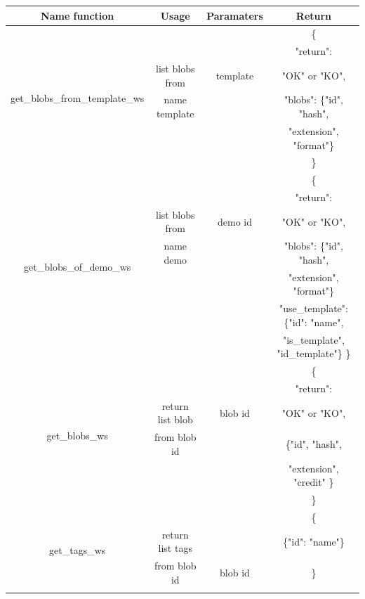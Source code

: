 \newpage
\begin{tabular}{|c||c|c|c|}
  \hline
  Name function & Usage & Paramaters & Return \tabularnewline
  \hline
  \multirow{6}{*}{get\_blobs\_from\_template\_ws}
  &                      &      & \{ \\
  &                      &      & "return": \\
  & list blobs from      & template  & "OK" or "KO", \\
  & name template        &      & "blobs": \{"id", "hash", \\
  &                      &      & "extension", "format"\} \\
  &                      &      & \} \\
  \hline
  \multirow{7}{*}{get\_blobs\_of\_demo\_ws}
  &                      &      & \{ \\
  &                      &      & "return": \\
  & list blobs from      & demo id & "OK" or "KO", \\
  & name demo            &      & "blobs": \{"id", "hash", \\
  &                      &      & "extension", "format"\} \\
  &                      &      & "use\_template": \{"id": "name", \\
  &                      &      & "is\_template", "id\_template"\} \} \\
  \hline
  \multirow{6}{*}{get\_blobs\_ws}
  &                      &      & \{ \\
  &                      &      & "return": \\
  & return list blob     & blob id & "OK" or "KO", \\
  & from blob id         &      & \{"id", "hash", \\
  &                      &      & "extension", "credit" \} \\
  &                      &      & \} \\
  \hline
  \multirow{4}{*}{get\_tags\_ws}
  &                      &      & \{ \\
  & return list tags     &      & \{"id": "name"\} \\
  & from blob id         & blob id & \} \\
  &                      &       &  \\
  \hline
\end{tabular}

